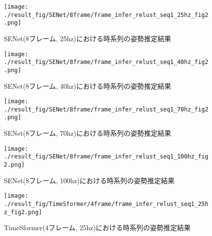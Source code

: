 
\begin{figure}[thpb]
  \begin{minipage}[htpb]{1.0\hsize}
  \begin{center}
  \texttt{[image: ./result\_fig/SENet/8frame/frame\_infer\_relust\_seq1\_25hz\_fig2.png]}
  \caption{SENet(8フレーム, 25hz)における時系列の姿勢推定結果}
  \end{center}
  \end{minipage}
\end{figure}

\begin{figure}[thpb]
  \begin{minipage}[htpb]{1.0\hsize}
  \begin{center}
  \texttt{[image: ./result\_fig/SENet/8frame/frame\_infer\_relust\_seq1\_40hz\_fig2.png]}
  \caption{SENet(8フレーム, 40hz)における時系列の姿勢推定結果}
  \end{center}
  \end{minipage}
\end{figure}

\begin{figure}[thpb]
  \begin{minipage}[htpb]{1.0\hsize}
  \begin{center}
  \texttt{[image: ./result\_fig/SENet/8frame/frame\_infer\_relust\_seq1\_70hz\_fig2.png]}
  \caption{SENet(8フレーム, 70hz)における時系列の姿勢推定結果}
  \end{center}
  \end{minipage}
\end{figure}

\begin{figure}[thpb]
  \begin{minipage}[htpb]{1.0\hsize}
  \begin{center}
  \texttt{[image: ./result\_fig/SENet/8frame/frame\_infer\_relust\_seq1\_100hz\_fig2.png]}
  \caption{SENet(8フレーム, 100hz)における時系列の姿勢推定結果}
  \end{center}
  \end{minipage}
\end{figure}



\begin{figure}[thpb]
  \begin{minipage}[htpb]{1.0\hsize}
  \begin{center}
  \texttt{[image: ./result\_fig/TimeSformer/4frame/frame\_infer\_relust\_seq1\_25hz\_fig2.png]}
  \caption{TimeSformer(4フレーム, 25hz)における時系列の姿勢推定結果}
  \end{center}
  \end{minipage}
\end{figure}

